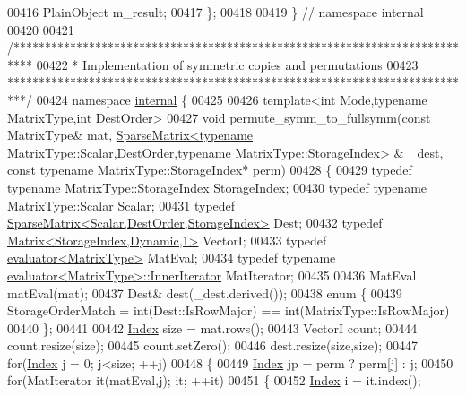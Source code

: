 \begin{DoxyCode}
00416   PlainObject m\_result;
00417 \};
00418 
00419 \} \textcolor{comment}{// namespace internal}
00420 
00421 \textcolor{comment}{/***************************************************************************}
00422 \textcolor{comment}{* Implementation of symmetric copies and permutations}
00423 \textcolor{comment}{***************************************************************************/}
00424 \textcolor{keyword}{namespace }\hyperlink{namespaceinternal}{internal} \{
00425 
00426 \textcolor{keyword}{template}<\textcolor{keywordtype}{int} Mode,\textcolor{keyword}{typename} MatrixType,\textcolor{keywordtype}{int} DestOrder>
00427 \textcolor{keywordtype}{void} permute\_symm\_to\_fullsymm(\textcolor{keyword}{const} MatrixType& mat, 
      \hyperlink{group___sparse_core___module_class_eigen_1_1_sparse_matrix}{SparseMatrix<typename MatrixType::Scalar,DestOrder,typename MatrixType::StorageIndex>}
      & \_dest, \textcolor{keyword}{const} \textcolor{keyword}{typename} MatrixType::StorageIndex* perm)
00428 \{
00429   \textcolor{keyword}{typedef} \textcolor{keyword}{typename} MatrixType::StorageIndex StorageIndex;
00430   \textcolor{keyword}{typedef} \textcolor{keyword}{typename} MatrixType::Scalar Scalar;
00431   \textcolor{keyword}{typedef} \hyperlink{group___sparse_core___module_class_eigen_1_1_sparse_matrix}{SparseMatrix<Scalar,DestOrder,StorageIndex>} Dest;
00432   \textcolor{keyword}{typedef} \hyperlink{group___core___module}{Matrix<StorageIndex,Dynamic,1>} VectorI;
00433   \textcolor{keyword}{typedef} \hyperlink{struct_eigen_1_1internal_1_1evaluator}{evaluator<MatrixType>} MatEval;
00434   \textcolor{keyword}{typedef} \textcolor{keyword}{typename} \hyperlink{struct_eigen_1_1internal_1_1evaluator}{evaluator<MatrixType>::InnerIterator} MatIterator;
00435   
00436   MatEval matEval(mat);
00437   Dest& dest(\_dest.derived());
00438   \textcolor{keyword}{enum} \{
00439     StorageOrderMatch = int(Dest::IsRowMajor) == int(MatrixType::IsRowMajor)
00440   \};
00441   
00442   \hyperlink{namespace_eigen_a62e77e0933482dafde8fe197d9a2cfde}{Index} size = mat.rows();
00443   VectorI count;
00444   count.resize(size);
00445   count.setZero();
00446   dest.resize(size,size);
00447   \textcolor{keywordflow}{for}(\hyperlink{namespace_eigen_a62e77e0933482dafde8fe197d9a2cfde}{Index} j = 0; j<size; ++j)
00448   \{
00449     \hyperlink{namespace_eigen_a62e77e0933482dafde8fe197d9a2cfde}{Index} jp = perm ? perm[j] : j;
00450     \textcolor{keywordflow}{for}(MatIterator it(matEval,j); it; ++it)
00451     \{
00452       \hyperlink{namespace_eigen_a62e77e0933482dafde8fe197d9a2cfde}{Index} i = it.index();

\end{DoxyCode}
